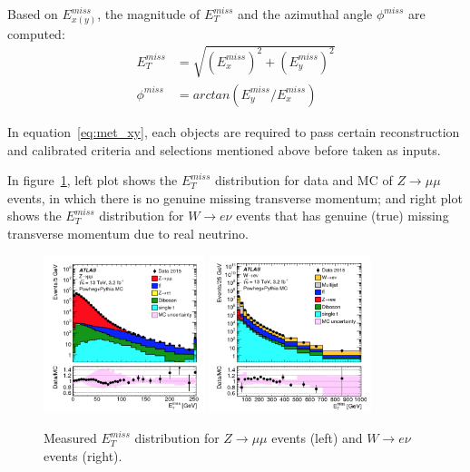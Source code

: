 Based on $E_{x(y)}^{miss}$, the magnitude of $E_{T}^{miss}$ and the azimuthal angle $\phi^{miss}$ are computed:
\begin{equation}
\begin{split}
	E_{T}^{miss} &= \sqrt{ \left(E_{x}^{miss}\right)^{2} + \left(E_{y}^{miss}\right)^{2} } \\
	\phi^{miss} &= arctan \left(E_{y}^{miss}/E_{x}^{miss}\right)
\end{split}
\end{equation}

In equation~\ref{eq:met_xy}, each objects are required to pass certain reconstruction and calibrated criteria and selections mentioned above before taken as inputs.

In figure~\ref{fig:met_dis}, left plot shows the $E_{T}^{miss}$ distribution for data and MC of $Z \rightarrow \mu\mu$ events, in which there is no genuine missing transverse momentum;
and right plot shows the $E_{T}^{miss}$ distribution for $W \rightarrow e\nu$ events that has genuine (true) missing transverse momentum due to real neutrino.
\begin{figure}[!htb]
  \centering
  \includegraphics[width=0.42\textwidth]{figures/Simulation/met_Zmm.png}
  \includegraphics[width=0.42\textwidth]{figures/Simulation/met_Wev.png}
  \caption{Measured $E_{T}^{miss}$ distribution for $Z \rightarrow \mu\mu$ events (left) and $W \rightarrow e\nu$ events (right). }
  \label{fig:met_dis}
\end{figure}

